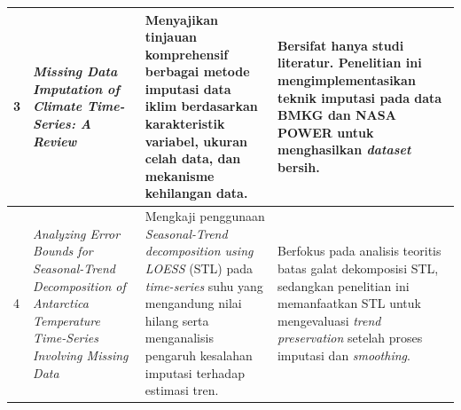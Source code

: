 \begin{longtable}{|p{}|p{}|p{}|p{}|}
3 &
\textit{Missing Data Imputation of Climate Time-Series: A Review} \citep{alejo2025}
&
Menyajikan tinjauan komprehensif berbagai metode imputasi data iklim berdasarkan karakteristik variabel, ukuran celah data, dan mekanisme kehilangan data.
&
Bersifat hanya studi literatur. Penelitian ini mengimplementasikan teknik imputasi pada data BMKG dan NASA POWER untuk menghasilkan \textit{dataset} bersih.
\\ \hline

4 &
\textit{Analyzing Error Bounds for Seasonal-Trend Decomposition of Antarctica Temperature Time-Series Involving Missing Data} \citep{kwok2023}
&
Mengkaji penggunaan \textit{Seasonal-Trend decomposition using LOESS} (STL) pada \textit{time-series} suhu yang mengandung nilai hilang serta menganalisis pengaruh kesalahan imputasi terhadap estimasi tren.
&
Berfokus pada analisis teoritis batas galat dekomposisi STL, sedangkan penelitian ini memanfaatkan STL untuk mengevaluasi \textit{trend preservation} setelah proses imputasi dan \textit{smoothing}.
\\ \hline


\end{longtable}

\vspace*{0.8cm} 


